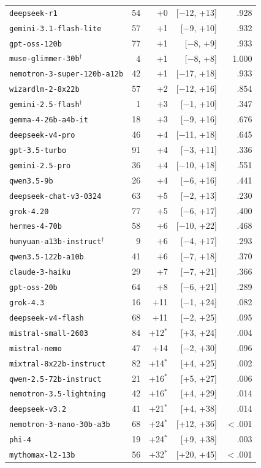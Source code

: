{\begin{tabular}[t]{lrrrr}
\texttt{deepseek-r1} & 54 & +0 & [$-$12, +13] & .928 \\
\texttt{gemini-3.1-flash-lite} & 57 & +1 & [$-$9, +10] & .932 \\
\texttt{gpt-oss-120b} & 77 & +1 & [$-$8, +9] & .933 \\
\texttt{muse-glimmer-30b}$^\dagger$ & 4 & +1 & [$-$8, +8] & 1.000 \\
\texttt{nemotron-3-super-120b-a12b} & 42 & +1 & [$-$17, +18] & .933 \\
\texttt{wizardlm-2-8x22b} & 57 & +2 & [$-$12, +16] & .854 \\
\texttt{gemini-2.5-flash}$^\dagger$ & 1 & +3 & [$-$1, +10] & .347 \\
\texttt{gemma-4-26b-a4b-it} & 18 & +3 & [$-$9, +16] & .676 \\
\texttt{deepseek-v4-pro} & 46 & +4 & [$-$11, +18] & .645 \\
\texttt{gpt-3.5-turbo} & 91 & +4 & [$-$3, +11] & .336 \\
\texttt{gemini-2.5-pro} & 36 & +4 & [$-$10, +18] & .551 \\
\texttt{qwen3.5-9b} & 26 & +4 & [$-$6, +16] & .441 \\
\texttt{deepseek-chat-v3-0324} & 63 & +5 & [$-$2, +13] & .230 \\
\texttt{grok-4.20} & 77 & +5 & [$-$6, +17] & .400 \\
\texttt{hermes-4-70b} & 58 & +6 & [$-$10, +22] & .468 \\
\texttt{hunyuan-a13b-instruct}$^\dagger$ & 9 & +6 & [$-$4, +17] & .293 \\
\texttt{qwen3.5-122b-a10b} & 41 & +6 & [$-$7, +18] & .370 \\
\texttt{claude-3-haiku} & 29 & +7 & [$-$7, +21] & .366 \\
\texttt{gpt-oss-20b} & 64 & +8 & [$-$6, +21] & .289 \\
\texttt{grok-4.3} & 16 & +11 & [$-$1, +24] & .082 \\
\texttt{deepseek-v4-flash} & 68 & +11 & [$-$2, +25] & .095 \\
\texttt{mistral-small-2603} & 84 & +12$^*$ & [+3, +24] & .004 \\
\texttt{mistral-nemo} & 47 & +14 & [$-$2, +30] & .096 \\
\texttt{mixtral-8x22b-instruct} & 82 & +14$^*$ & [+4, +25] & .002 \\
\texttt{qwen-2.5-72b-instruct} & 21 & +16$^*$ & [+5, +27] & .006 \\
\texttt{nemotron-3.5-lightning} & 42 & +16$^*$ & [+4, +29] & .014 \\
\texttt{deepseek-v3.2} & 41 & +21$^*$ & [+4, +38] & .014 \\
\texttt{nemotron-3-nano-30b-a3b} & 68 & +24$^*$ & [+12, +36] & $<$.001 \\
\texttt{phi-4} & 19 & +24$^*$ & [+9, +38] & .003 \\
\texttt{mythomax-l2-13b} & 56 & +32$^*$ & [+20, +45] & $<$.001 \\
\bottomrule
\end{tabular}}
